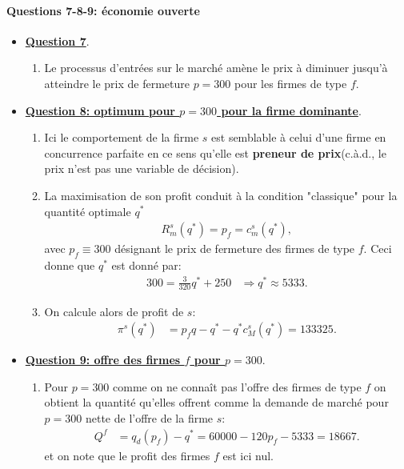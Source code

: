   \begin{frame}[allowframebreaks]{\insertsection}
     \framesubtitle{Questions 7-8-9: économie ouverte}
  \begin{itemize}
  \item \underline{\textbf{Question 7}}.
  \begin{enumerate}[$\cdot$]
  \item Le processus d'entrées sur le marché amène le prix à diminuer jusqu'à atteindre le prix de fermeture $p=300$ pour les firmes de type $f$.
  \end{enumerate}
  \item  \underline{\textbf{Question 8: optimum pour $p=300$ pour la firme dominante}}.
  \begin{enumerate}[$\cdot$]
  \item Ici le comportement de la firme $s$ est semblable à celui d'une firme en concurrence parfaite en ce sens qu'elle est \textbf{preneur de prix}(c.à.d., le prix n'est pas une variable de décision).
  \item La maximisation de son profit conduit à la condition "classique"  pour la quantité optimale $q^*$
  \begin{align*}
  R_m^s(q^*) = p_f = c_m^s(q^*),
  \end{align*}
  avec $p_f \equiv 300$ désignant le prix de fermeture des firmes de type $f$. Ceci donne que $q^*$ est donné par:
  \begin{align*}
  300= \frac{3}{320}q^* +250 &\Rightarrow  q^* \approx 5333.
  \end{align*}
  \item On calcule alors de profit de $s$:
  \begin{align*}
  \pi^s(q^*) &= p_fq -q^* - q^*c_M^s(q^*) = 133325.
  \end{align*}
  \end{enumerate}
  \item  \underline{\textbf{Question 9: offre des firmes $f$ pour $p=300$}}.
  \begin{enumerate}[$\cdot$]
  \item Pour $p=300$ comme on ne connaît pas l'offre des firmes de type $f$ on obtient la quantité qu'elles offrent comme la demande de marché pour $p=300$ nette de l'offre de la firme $s$:
  \begin{align}
  Q^f &= q_d(p_f) - q^* = 60000 - 120p_f - 5333 = 18667.
  \end{align}
  et on note que le profit des firmes $f$ est ici nul.
  \end{enumerate}
  \end{itemize}
  \end{frame}
  

